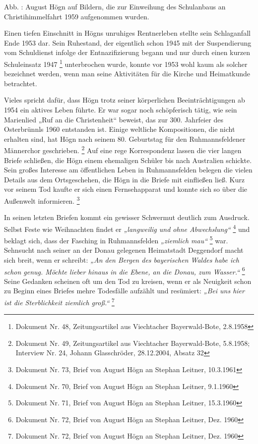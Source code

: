 \documentclass[a4paper]{article}
\newcommand\textstyleZitate[1]{\textit{#1}}
\newcommand\textstyleFootnoteSymbol[1]{\textsuperscript{#1}}
\newcounter{Abb}
\renewcommand\theAbb{\arabic{Abb}}
\begin{document}
Abb. \stepcounter{Abb}{\theAbb}: August Högn auf Bildern, die zur
Einweihung des Schulanbaus an Christihimmelfahrt 1959 aufgenommen
wurden.

Einen tiefen Einschnitt in Högns unruhiges Rentnerleben stellte sein
Schlaganfall Ende 1953 dar. Sein Ruhestand, der eigentlich schon 1945
mit der Suspendierung vom Schuldienst infolge der Entnazifizierung
begann und nur durch einen kurzen Schuleinsatz 1947 \footnote{Dokument
Nr. 48, Zeitungsartikel aus Viechtacher Bayerwald-Bote, 2.8.1958}
unterbrochen wurde, konnte vor 1953 wohl kaum als solcher bezeichnet
werden, wenn man seine Aktivitäten für die Kirche und Heimatkunde
betrachtet.

Vieles spricht dafür, dass Högn trotz seiner körperlichen
Beeinträchtigungen ab 1954 ein aktives Leben führte. Er war sogar noch
schöpferisch tätig, wie sein Marienlied „Ruf an die Christenheit“
beweist, das zur 300. Jahrfeier des Osterbrünnls 1960 entstanden ist.
Einige weltliche Kompositionen, die nicht erhalten sind, hat Högn nach
seinem 80. Geburtstag für den Ruhmannsfeldener Männerchor
geschrieben. \footnote{Dokument Nr. 49, Zeitungsartikel aus Viechtacher
Bayerwald-Bote, 5.8.1958; Interview Nr. 24, Johann Glasschröder,
28.12.2004, Absatz 32} Auf eine rege Korrespondenz lassen die vier
langen Briefe schließen, die Högn einem ehemaligen Schüler bis nach
Australien schickte. Sein großes Interesse am öffentlichen Leben in
Ruhmannsfelden belegen die vielen Details aus dem Ortsgeschehen, die
Högn in die Briefe mit einfließen ließ. Kurz vor seinem Tod kaufte er
sich einen Fernsehapparat und konnte sich so über die Außenwelt
informieren. \footnote{Dokument Nr. 73, Brief von August Högn an
Stephan Leitner, 10.3.1961}

In seinen letzten Briefen kommt ein gewisser Schwermut deutlich zum
Ausdruck. Selbst Feste wie Weihnachten findet er
\textstyleZitate{„langweilig und ohne Abwechslung“ } \footnote{Dokument
Nr. 70, Brief von August Högn an Stephan Leitner, 9.1.1960} und beklagt
sich, dass der Fasching in Ruhmannsfelden \textstyleZitate{„ziemlich
mau“}\textstyleFootnoteSymbol{ } \footnote{Dokument Nr. 71, Brief von
August Högn an Stephan Leitner, 15.3.1960}\textstyleZitate{ }war.
Sehnsucht nach seiner an der Donau gelegenen Heimatstadt Deggendorf
macht sich breit, wenn er schreibt: \textstyleZitate{„An den Bergen des
bayerischen Waldes habe ich schon genug. Möchte lieber hinaus in die
Ebene, an die Donau, zum Wasser.“}\textstyleFootnoteSymbol{ }\footnote{
Dokument Nr. 72, Brief von August Högn an Stephan Leitner, Dez. 1960}
Seine Gedanken scheinen oft um den Tod zu kreisen, wenn er als
Neuigkeit schon zu Beginn eines Briefes mehre Todesfälle aufzählt und
resümiert: \textstyleZitate{„Bei uns hier ist die Sterblichkeit
ziemlich groß.“ } \footnote{Dokument Nr. 72, Brief von August Högn an
Stephan Leitner, Dez. 1960}
\end{document}
